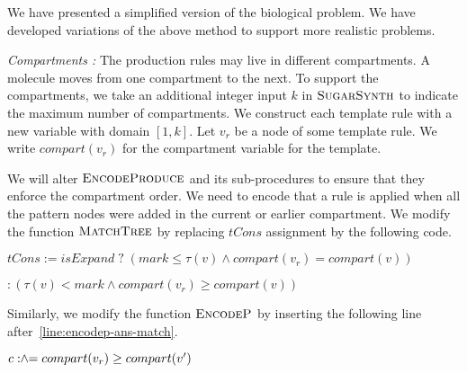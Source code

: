 We have presented a simplified version of
the biological problem.
We have developed variations of the above method to support more realistic problems.


{\em Compartments : } The production rules may live in different compartments.
A molecule moves from one compartment to the next.
To support the compartments, we take an additional integer
input $k$ in $\textsc{SugarSynth}$ to indicate the maximum number
of compartments.
We construct each template rule with a new variable with domain $[1,k]$.
Let $v_r$ be a node of some template rule. We write $compart(v_r)$
for the compartment variable for the template.

We will alter $\textsc{EncodeProduce}$ and its sub-procedures to
ensure that they enforce the compartment order.
We need to encode that a rule is applied when all the
pattern nodes were added in the current or earlier compartment.
We modify the function $\textsc{MatchTree}$ by replacing
$tCons$ assignment by the following code.\\
\begin{minipage}{1.0\linewidth}
\begin{algorithmic}[1]
  \State $tCons := isExpand \;?\; ( mark \leq \tau(v)  \land compart(v_r) = compart(v) )$\par
  \mbox{}\qquad\qquad\hspace{10mm} $:( \tau(v) < mark  \land compart(v_r) \geq compart(v) )$
\end{algorithmic}
\end{minipage}
Similarly, we modify the function
$\textsc{EncodeP}$ by inserting the following line after~\ref{line:encodep-ans-match}.\\
\begin{minipage}{1.0\linewidth}
\begin{algorithmic}[1]
  \State $c \mathrel{:\hspace{-3pt}\land\hspace{-3pt}=} compart(v_r) \geq compart(v')$
\end{algorithmic}  
\end{minipage}

